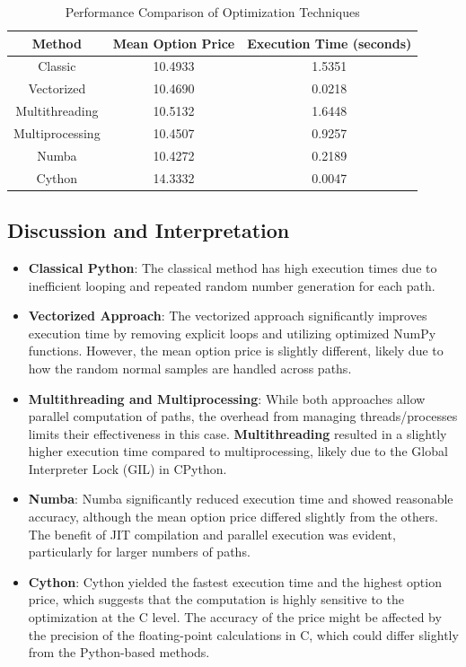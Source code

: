 \documentclass[12pt,a4paper]{report}
\begin{document}
\begin{table}[h!]
\centering
\begin{tabular}{|c|c|c|}
\hline
\textbf{Method} & \textbf{Mean Option Price} & \textbf{Execution Time (seconds)} \\ \hline
Classic & 10.4933 & 1.5351 \\ \hline
Vectorized & 10.4690 & 0.0218 \\ \hline
Multithreading & 10.5132 & 1.6448 \\ \hline
Multiprocessing & 10.4507 & 0.9257 \\ \hline
Numba & 10.4272 & 0.2189 \\ \hline
Cython & 14.3332 & 0.0047 \\ \hline
\end{tabular}
\caption{Performance Comparison of Optimization Techniques}
\end{table}

\subsection{Discussion and Interpretation}

\begin{itemize}
    \item \textbf{Classical Python}: The classical method has high execution times due to inefficient looping and repeated random number generation for each path.
    \item \textbf{Vectorized Approach}: The vectorized approach significantly improves execution time by removing explicit loops and utilizing optimized NumPy functions. However, the mean option price is slightly different, likely due to how the random normal samples are handled across paths.
    \item \textbf{Multithreading and Multiprocessing}: While both approaches allow parallel computation of paths, the overhead from managing threads/processes limits their effectiveness in this case. \textbf{Multithreading} resulted in a slightly higher execution time compared to multiprocessing, likely due to the Global Interpreter Lock (GIL) in CPython.
    \item \textbf{Numba}: Numba significantly reduced execution time and showed reasonable accuracy, although the mean option price differed slightly from the others. The benefit of JIT compilation and parallel execution was evident, particularly for larger numbers of paths.
    \item \textbf{Cython}: Cython yielded the fastest execution time and the highest option price, which suggests that the computation is highly sensitive to the optimization at the C level. The accuracy of the price might be affected by the precision of the floating-point calculations in C, which could differ slightly from the Python-based methods.
\end{itemize}
\end{document}
